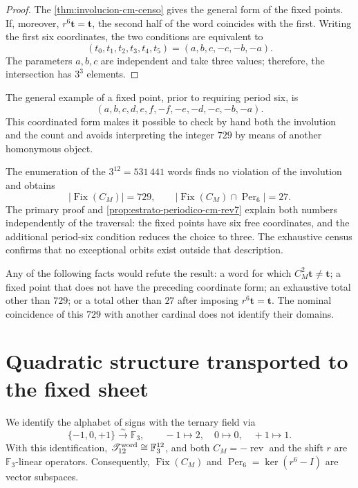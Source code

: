 \begin{proof}
The \cref{thm:involucion-cm-censo} gives the general form of the fixed points.
If, moreover, \(r^6\mathbf t=\mathbf t\), the second half of the word coincides
with the first. Writing the first six coordinates, the two
conditions are equivalent to
\[
 (t_0,t_1,t_2,t_3,t_4,t_5)
 =(a,b,c,-c,-b,-a).
\]
The parameters \(a,b,c\) are independent and take three values; therefore,
the intersection has \(3^3\) elements.
\end{proof}

The general example of a fixed point, prior to requiring period six, is
\[
 (a,b,c,d,e,f,-f,-e,-d,-c,-b,-a).
\]
This coordinated form makes it possible to check by hand both the involution and the
count and avoids interpreting the integer \(729\) by means of another homonymous object.

\begin{remark}
\label{rem:procedencia-n40-cm}
The enumeration of the \(3^{12}=531\,441\) words finds no
violation of the involution and obtains
\[
 |\operatorname{Fix}(C_M)|=729,
 \qquad
 |\operatorname{Fix}(C_M)\cap\operatorname{Per}_6|=27.
\]
The primary proof and \cref{prop:estrato-periodico-cm-rev7} explain
both numbers independently of the traversal: the fixed points have six
free coordinates, and the additional period-six condition reduces the
choice to three. The exhaustive census confirms that no
exceptional orbits exist outside that description.
\end{remark}

\begin{criterion}
\label{crit:falsadores-cm}
Any of the following facts would refute the result: a word for which
\(C_M^2\mathbf t\ne\mathbf t\); a fixed point that does not have the preceding coordinate
form; an exhaustive total other than \(729\); or a total other than
\(27\) after imposing \(r^6\mathbf t=\mathbf t\). The nominal coincidence of this
\(729\) with another cardinal does not identify their domains.
\end{criterion}

\section{Quadratic structure transported to the fixed sheet}
\label{sec:estructura-cuadratica-estrato-fijo-cm}

We identify the alphabet of signs with the ternary field via
\[
 \{-1,0,+1\}\xrightarrow{\sim}\mathbb F_3,
 \qquad
 -1\longmapsto2,\quad 0\longmapsto0,\quad +1\longmapsto1.
\]
With this identification,
\(\mathscr T_{12}^{\rm word}\cong\mathbb F_3^{12}\), and both
\(C_M=-\operatorname{rev}\) and the shift \(r\) are
\(\mathbb F_3\)-linear operators. Consequently,
\(\operatorname{Fix}(C_M)\) and
\(\operatorname{Per}_6=\ker(r^6-I)\) are vector subspaces.


